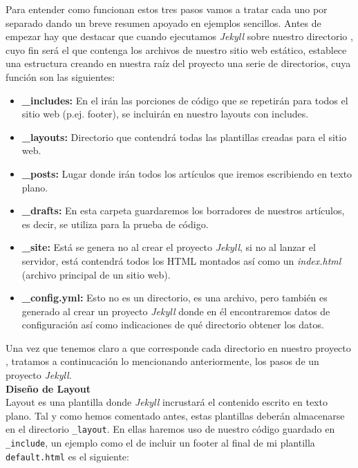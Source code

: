 \documentclass[a4paper, 12pt]{book}
\begin{document}
Para entender como funcionan estos tres pasos vamos a tratar cada uno por separado dando un  breve resumen apoyado en ejemplos sencillos. Antes de empezar hay que destacar que cuando ejecutamos \emph{Jekyll} sobre nuestro directorio , cuyo fin será el que contenga los archivos de nuestro sitio web estático, establece una estructura creando en nuestra raíz del proyecto una serie de directorios, cuya función son las siguientes:\\
\begin{itemize}
    \item[] \textbf{\_includes:} En el irán las porciones de código que se repetirán para todos el sitio web (p.ej. footer), se incluirán en nuestro layouts con includes.
    \item[] \textbf{\_layouts:} Directorio que contendrá todas las plantillas creadas para el sitio web.
    \item[] \textbf{\_posts:} Lugar donde irán todos los artículos que iremos escribiendo en texto plano. 
    \item[] \textbf{\_drafts:} En esta carpeta guardaremos los borradores de nuestros artículos, es decir, se utiliza para la prueba de código.
    \item[] \textbf{\_site:} Está se genera no al crear el proyecto \emph{Jekyll}, si no al lanzar el servidor, está contendrá todos los HTML montados así como un \textit{index.html} (archivo principal de un sitio web).
    \item[] \textbf{\_config.yml:} Esto no es un directorio, es una archivo, pero también es generado al crear un proyecto \emph{Jekyll} donde en él encontraremos datos de configuración así como indicaciones de qué directorio obtener los datos.
\end{itemize}
Una vez que tenemos claro a que corresponde cada directorio en nuestro proyecto , tratamos a continucación lo mencionando anteriormente, los pasos  de un proyecto \emph{Jekyll}. \\

\textbf{\large{Diseño de Layout}} \\
Layout es una plantilla donde \emph{Jekyll} incrustará el contenido escrito en texto plano. Tal y como hemos comentado antes, estas plantillas deberán almacenarse en el directorio \texttt{\_layout}. En ellas  haremos uso de nuestro código guardado en \texttt{\_include}, un ejemplo como el de incluir un footer al final de mi plantilla \texttt{default.html} es el siguiente: 
\end{document}
